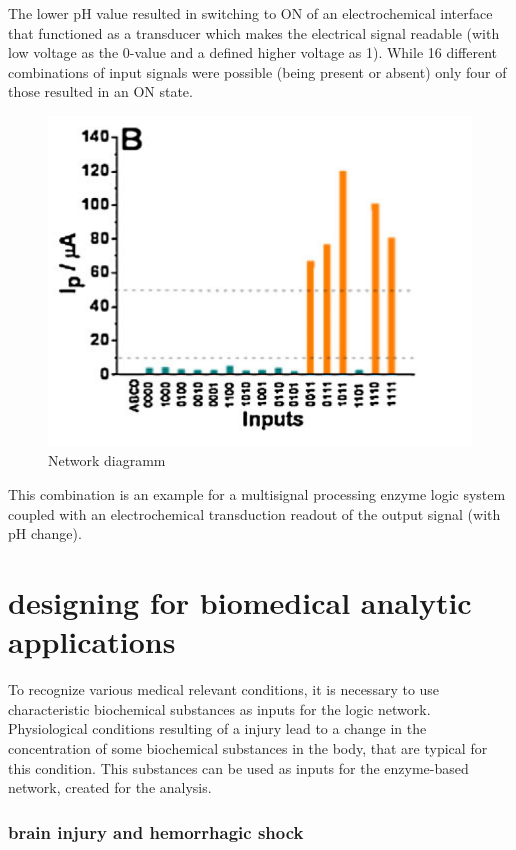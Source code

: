 \documentclass[runningheads]{llncs}
\begin{document}
	
		The lower pH value resulted in switching to ON of an electrochemical interface that functioned as a transducer which makes the electrical signal readable (with low voltage as the 0-value and a defined higher voltage as 1). While 16 different combinations of input signals were possible (being present or absent) only four of those resulted in an ON state.
		\begin{figure}[H] \centering \includegraphics[scale= 0.4]{pics/ph.png} \caption{Network diagramm} \label{img:ph} \end{figure}
	
	
		This combination is an example for a multisignal processing enzyme logic system coupled with an electrochemical transduction readout of the output signal (with pH change).



\section{designing for biomedical analytic applications}
	To recognize various medical relevant conditions, it is necessary to use characteristic biochemical substances as inputs for the logic network.
	Physiological conditions resulting of a injury lead to a change in the concentration of some biochemical substances in the body, that are typical for this condition. This substances can be used as inputs for the enzyme-based network, created for the analysis.
	
	
	\subsubsection{brain injury and hemorrhagic shock}
	
\end{document}
